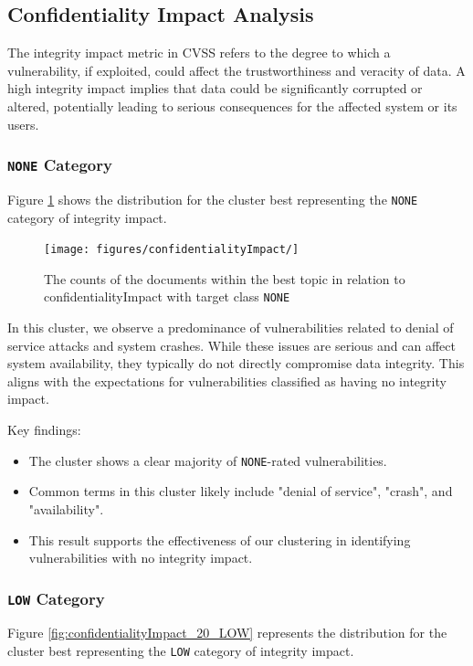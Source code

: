 \subsection{Confidentiality Impact Analysis}

The integrity impact metric in CVSS refers to the degree to which a vulnerability, if exploited,
could affect the trustworthiness and veracity of data. A high integrity impact implies that data
could be significantly corrupted or altered, potentially leading to serious consequences for the
affected system or its users.

\subsubsection{\texttt{NONE} Category}

Figure \ref{fig:confidentialityImpact_20_NONE} shows the distribution for the cluster best
representing the \texttt{NONE} category of integrity impact.

\begin{figure}[h]
	\centering
	\texttt{[image: figures/confidentialityImpact/]}
	\caption{The counts of the documents within the best topic in relation to confidentialityImpact with target class \texttt{NONE}}
	\label{fig:confidentialityImpact_20_NONE}
\end{figure}

In this cluster, we observe a predominance of vulnerabilities related to denial of service attacks
and system crashes. While these issues are serious and can affect system availability, they
typically do not directly compromise data integrity. This aligns with the expectations for
vulnerabilities classified as having no integrity impact.

Key findings:
\begin{itemize}
	\item The cluster shows a clear majority of \texttt{NONE}-rated vulnerabilities.
	\item Common terms in this cluster likely include "denial of service", "crash", and "availability".
	\item This result supports the effectiveness of our clustering in identifying vulnerabilities with no integrity impact.
\end{itemize}

\subsubsection{\texttt{LOW} Category}
Figure \ref{fig:confidentialityImpact_20_LOW} represents the distribution for the cluster best representing the \texttt{LOW} category of integrity impact.

